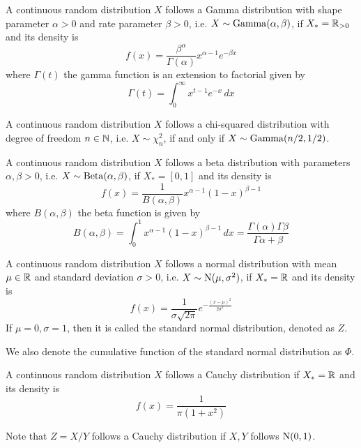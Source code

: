 \documentclass[11pt]{article}
\begin{document}
\begin{definition}
  A continuous random distribution \(X\) follows a Gamma distribution with shape parameter \(\alpha >0\) and rate parameter \(\beta >0\), i.e. \(X\sim \rm{Gamma}(\alpha,\beta)\), if \(X_*=\R_{>0}\) and its density is 
  \[f(x)=\frac{\beta^\alpha}{\Gamma(\alpha)}x^{\alpha-1}e^{-\beta x}\]
  where \(\Gamma(t)\) the gamma function is an extension to factorial given by
  \[\Gamma(t)=\int_{0}^{\infty}x^{t-1}e^{-x}\,dx\] 
\end{definition}

\begin{definition}
  A continuous random distribution \(X\) follows a chi-squared distribution with degree of freedom \(n\in\N\), i.e. \(X\sim \chi^2_n\), if and only if \(X\sim \rm{Gamma}(n/2,1/2)\).
\end{definition}

\begin{definition}
  A continuous random distribution \(X\) follows a beta distribution with parameters \(\alpha,\beta >0\), i.e. \(X\sim \rm{Beta}(\alpha,\beta)\), if \(X_*=[0,1]\) and its density is 
  \[f(x)=\frac{1}{B(\alpha,\beta)}x^{\alpha-1}(1-x)^{\beta-1}\]
  where \(B(\alpha,\beta)\) the beta function is given by
  \[B(\alpha,\beta)=\int_{0}^{1}x^{\alpha-1}(1-x)^{\beta-1}\,dx=\frac{\Gamma(\alpha)\Gamma{\beta}}{\Gamma{\alpha+\beta}}\]
\end{definition}

\begin{definition}
  A continuous random distribution \(X\) follows a normal distribution with mean \(\mu\in\R\) and standard deviation \(\sigma>0\), i.e. \(X\sim \rm{N}(\mu,\sigma^2)\), if \(X_*=\R\) and its density is 
  \[f(x)=\frac{1}{\sigma\sqrt{2\pi}}e^{-\frac{(x-\mu)^2}{2\sigma^2}}\]
  If \(\mu=0,\sigma=1\), then it is called the standard normal distribution, denoted as \(Z\).

  We also denote the cumulative function of the standard normal distribution as \(\Phi\).
\end{definition}

\begin{definition}
  A continuous random distribution \(X\) follows a Cauchy distribution if \(X_*=\R\) and its density is 
  \[f(x)=\frac{1}{\pi(1+x^2)}\]
\end{definition}
Note that \(Z=X/Y\) follows a Cauchy distribution if \(X,Y\) follows \(\rm{N}(0,1)\).
\end{document}
